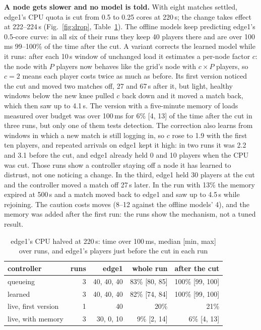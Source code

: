 \documentclass[conference]{IEEEtran}
\begin{document}
\textbf{A node gets slower and no model is told.} With eight matches
settled, edge1's CPU quota is cut from 0.5 to 0.25 cores at 220\,s; the
change takes effect at 222--224\,s (Fig.~\ref{fig:drop},
Table~\ref{tab:drop}). The offline models keep predicting edge1's 0.5-core
curve: in all six of their runs they keep 40 players there and are over
100\,ms 99--100\% of the time after the cut. A variant corrects the learned
model while it runs: after each 10\,s window of unchanged load it estimates a
per-node factor $c$: the node with $P$ players now behaves like the grid's
node with $c \times P$ players, so $c=2$ means each player costs twice as
much as before. Its first version noticed the cut and moved two matches off,
27 and 67\,s after it, but light, healthy windows below the new knee pulled
$c$ back down and it moved a match back, which then saw up to 4.1\,s. The version
with a five-minute memory of loads measured over budget was over 100\,ms for
6\% [4, 13] of the time after the cut in three runs, but only one of them
tests detection. The correction also learns from windows in which a new match
is still logging in, so $c$ rose to 1.9 with the first ten players, and
repeated arrivals on edge1 kept it high: in two runs it was 2.2 and 3.1
before the cut, and edge1 already held 0 and 10 players when the CPU was cut.
Those runs show a controller staying off a node it has learned to distrust,
not one noticing a change. In the third, edge1 held 30 players at the cut and
the controller moved a match off 27\,s later. In the run with 13\% the
memory expired at 500\,s and a match moved back to edge1 and saw up to 4.5\,s
while rejoining. The caution costs moves (8--12 against the offline models'
4), and the memory was added after the first run: the runs show the
mechanism, not a tuned result.

\begin{table}[t]
\centering
\caption{edge1's CPU halved at 220\,s: time over 100\,ms, median [min, max]
over runs, and edge1's players just before the cut in each run}
\label{tab:drop}
\setlength{\tabcolsep}{2.5pt}
\begin{tabular}{lrrrr}
\toprule
controller & runs & edge1 & whole run & after the cut \\
\midrule
queueing             & 3 & 40, 40, 40 & 83\% [80, 85] & 100\% [99, 100] \\
learned              & 3 & 40, 40, 40 & 82\% [74, 84] & 100\% [99, 100] \\
live, first version  & 1 & 40         & 20\%          & 21\% \\
live, with memory    & 3 & 30, 0, 10  & 9\% [2, 14]   & 6\% [4, 13] \\
\bottomrule
\end{tabular}
\end{table}
\end{document}
